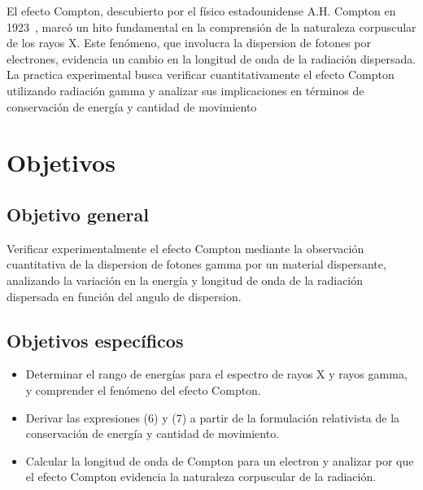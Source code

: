 \documentclass[letterpaper, 12pt]{article}
\begin{document}
El efecto Compton, descubierto por el físico estadounidense
A.H. Compton en 1923~\cite{el_efecto_compton}, marcó un
hito fundamental en la comprensión de la naturaleza
corpuscular de los rayos X. Este fenómeno, que involucra la
dispersion de fotones por electrones, evidencia un cambio
en la longitud de onda de la radiación dispersada. La
practica experimental busca verificar cuantitativamente el
efecto Compton utilizando radiación gamma y analizar sus
implicaciones en términos de conservación de energía y
cantidad de movimiento

\section{Objetivos}

\subsection{Objetivo general}

Verificar experimentalmente el efecto Compton mediante la
observación cuantitativa de la dispersion de fotones gamma
por un material dispersante, analizando la variación en la
energía y longitud de onda de la radiación dispersada en
función del angulo de dispersion.

\subsection{Objetivos específicos}

\begin{itemize}[label=$\triangleright$]
      \item Determinar el rango de energías para el espectro de rayos X
            y rayos gamma, y comprender el fenómeno del efecto Compton.

      \item Derivar las expresiones (6) y (7) a partir de la
            formulación relativista de la conservación de energía y
            cantidad de movimiento.

      \item Calcular la longitud de onda de Compton para un electron y
            analizar por que el efecto Compton evidencia la naturaleza
            corpuscular de la radiación.
\end{itemize}
\end{document}

